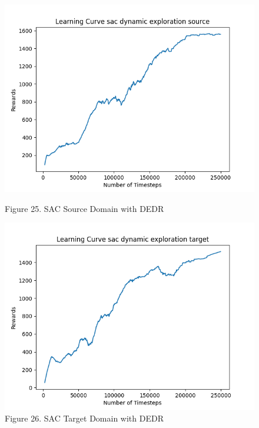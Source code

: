 \documentclass[12pt]{article}
\begin{document}
\begin{figure}[H]
    \centering
    \begin{minipage}{0.45\textwidth}
        \centering
        \includegraphics[width=\textwidth]{../images/Learning_Curve_SAC_DE_Source.png}
        \caption{Figure 25. SAC Source Domain with DEDR}
        \label{fig:sac_source_dedr}
    \end{minipage}
    \hfill
    \begin{minipage}{0.45\textwidth}
        \centering
        \includegraphics[width=\textwidth]{../images/Learning_Curve_SAC_DE_Target.png}
        \caption{Figure 26. SAC Target Domain with DEDR}
        \label{fig:sac_target_dedr}
    \end{minipage}

\end{figure}
\end{document}
